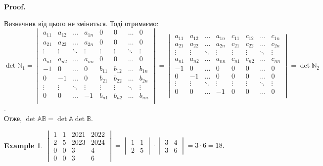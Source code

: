 \documentclass[a4paper, 10pt]{article}
\makeatletter
\theoremstyle{theoremdd}
\newtheorem{example}[theorem]{Example}
\renewenvironment{proof}[1][Proof.\\]{\par
\pushQED{\hfill \qed}%
\normalfont \topsep6\p@\@plus6\p@\relax
\trivlist
\item\relax
{\bfseries
#1\@addpunct{.}}\hspace\labelsep\ignorespaces
}{%
\popQED\endtrivlist\@endpefalse
}
\makeatother
\begin{document}
\begin{proof}
Визначник від цього не зміниться. Тоді отримаємо:\\
$\det \mathbb{N}_1 = \begin{vmatrix}
a_{11} & a_{12} & \dots & a_{1n} & 0 & 0 & \dots & 0 \\
a_{21} & a_{22} & \dots & a_{2n} & 0 & 0 & \dots & 0 \\
\vdots & \vdots & \ddots & \vdots & \vdots & \vdots & \ddots & \vdots \\
a_{n1} & a_{n2} & \dots & a_{nn} & 0 & 0 & \dots & 0 \\
-1 & 0 & \dots & 0 & b_{11} & b_{12} & \dots & b_{1n} \\
0 & -1 & \dots & 0 & b_{21} & b_{22} & \dots & b_{2n} \\
\vdots & \vdots & \ddots & \vdots & \vdots & \vdots & \ddots & \vdots \\
0 & 0 & \dots & -1 & b_{n1} & b_{n2} & \dots & b_{nn} \\
\end{vmatrix} = \begin{vmatrix}
a_{11} & a_{12} & \dots & a_{1n} & c_{11} & c_{12} & \dots & c_{1n} \\
a_{21} & a_{22} & \dots & a_{2n} & c_{21} & c_{22} & \dots & c_{2n} \\
\vdots & \vdots & \ddots & \vdots & \vdots & \vdots & \ddots & \vdots \\
a_{n1} & a_{n2} & \dots & a_{nn} & c_{n1} & c_{n2} & \dots & c_{nn} \\
-1 & 0 & \dots & 0 & 0 & 0 & \dots & 0 \\
0 & -1 & \dots & 0 & 0 & 0 & \dots & 0 \\
\vdots & \vdots & \ddots & \vdots & \vdots & \vdots & \ddots & \vdots \\
0 & 0 & \dots & -1 & 0 & 0 & \dots & 0 \\
\end{vmatrix} = \det \mathbb{N}_2$.\\
Отже, $\det \mathbb{A} \mathbb{B} = \det \mathbb{A} \det \mathbb{B}$.
\end{proof}

\begin{example}
$\begin{vmatrix}
1 & 1 & 2021 & 2022 \\
2 & 5 & 2023 & 2024 \\
0 & 0 & 3 & 4 \\
0 & 0 & 3 & 6
\end{vmatrix} = \begin{vmatrix}
1 & 1 \\
2 & 5
\end{vmatrix} \cdot \begin{vmatrix}
3 & 4 \\
3 & 6
\end{vmatrix} = 3 \cdot 6 = 18$.
\end{example}
\end{document}

